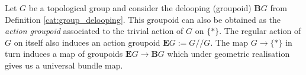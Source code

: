     \begin{construct}
        Let $G$ be a topological group and consider the delooping (groupoid) $\mathbf{B}G$ from Definition \ref{cat:group_delooping}. This groupoid can also be obtained as the \textit{action groupoid} associated to the trivial action of $G$ on $\{\ast\}$. The regular action of $G$ on itself also induces an action groupoid $\mathbf{E}G:=G/\!/G$. The map $G\rightarrow\{\ast\}$ in turn induces a map of groupoids $\mathbf{E}G\rightarrow\mathbf{B}G$ which under geometric realisation gives us a universal bundle map.
    \end{construct}